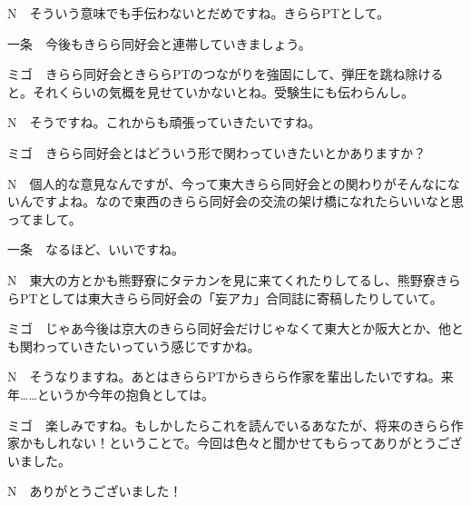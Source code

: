 \begin{multicols}{2}
\begin{description}
  \item{N}　そういう意味でも手伝わないとだめですね。きららPTとして。
  \item{一条}　今後もきらら同好会と連帯していきましょう。
  \item{ミゴ}　きらら同好会ときららPTのつながりを強固にして、弾圧を跳ね除けると。それくらいの気概を見せていかないとね。受験生にも伝わらんし。
  \item{N}　そうですね。これからも頑張っていきたいですね。
  \item{ミゴ}　きらら同好会とはどういう形で関わっていきたいとかありますか？
  \item{N}　個人的な意見なんですが、今って東大きらら同好会との関わりがそんなにないんですよね。なので東西のきらら同好会の交流の架け橋になれたらいいなと思ってまして。
  \item{一条}　なるほど、いいですね。
  \item{N}　東大の方とかも熊野寮にタテカンを見に来てくれたりしてるし、熊野寮きららPTとしては東大きらら同好会の「妄アカ」合同誌に寄稿したりしていて。
  \item{ミゴ}　じゃあ今後は京大のきらら同好会だけじゃなくて東大とか阪大とか、他とも関わっていきたいっていう感じですかね。
  \item{N}　そうなりますね。あとはきららPTからきらら作家を輩出したいですね。来年……というか今年の抱負としては。
  \item{ミゴ}　楽しみですね。もしかしたらこれを読んでいるあなたが、将来のきらら作家かもしれない！ということで。今回は色々と聞かせてもらってありがとうございました。
  \item{N}　ありがとうございました！
\end{description}

\end{multicols}
